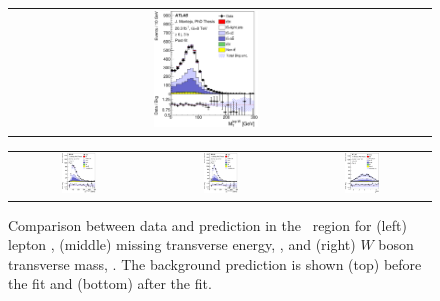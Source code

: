 \begin{figure}[tp]
\begin{tabular}{ccc}
  \includegraphics[width=0.27\textwidth]{Analysis/Figures_ttH/tesis_vars/postfit/WlepMT_6jetin3btagex.eps} \\
\end{tabular}
\caption{Comparison between data and prediction in the \sixthree\ region for (left) lepton \pt,  (middle) missing transverse energy, \met, and (right)  $W$ boson transverse mass, \mtw. The background prediction is shown (top) before the fit and (bottom) after the fit.}
  \label{fig:vars1_sixthree}
\vspace{0.5cm}
  \centering
  \begin{tabular}{ccc}
  \includegraphics[width=0.27\textwidth]{Analysis/Figures_ttH/tesis_vars/prefit/jet1_pt_6jetin3btagex.eps} &
  \includegraphics[width=0.27\textwidth]{Analysis/Figures_ttH/tesis_vars/prefit/bjet1_pt_6jetin3btagex.eps} &
  \includegraphics[width=0.27\textwidth]{Analysis/Figures_ttH/tesis_vars/prefit/lep_eta_6jetin3btagex.eps} \\

\end{tabular}
\end{figure}
